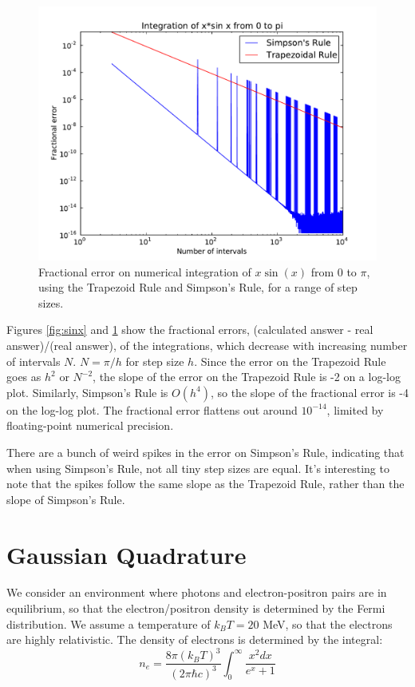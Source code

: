 \documentclass{article}
\begin{document}
\begin{figure}[h]
  \begin{center}
     \includegraphics[width=\textwidth]{xsinx}
  \end{center}
  \caption{Fractional error on numerical integration of $x\sin(x)$ from 0 to $\pi$, using
	   the Trapezoid Rule and Simpson's Rule, for a range of step sizes.}
  \label{fig:xsinx}
\end{figure}

Figures \ref{fig:sinx} and \ref{fig:xsinx} show the fractional errors, (calculated answer - real answer)/(real answer),
of the integrations, which
decrease with increasing number of intervals $N$. $N = \pi/h$ for step size $h$.
Since the error on the Trapezoid Rule goes as $h^2$ or $N^{-2}$, the slope of
the error on the Trapezoid Rule is -2 on a log-log plot.  Similarly, Simpson's
Rule is $O(h^4)$, so the slope of the fractional error is -4 on the log-log plot.
The fractional error flattens out around $10^{-14}$, limited by floating-point
numerical precision.

There are a bunch of weird spikes in the error on Simpson's Rule, indicating that when
using Simpson's Rule, not all tiny step sizes are equal.  It's interesting to note that
the spikes follow the same slope as the Trapezoid Rule, rather than the slope of Simpson's Rule.

\section{Gaussian Quadrature}

We consider an environment where photons and electron-positron pairs are in equilibrium, so that the
electron/positron density is determined by the Fermi distribution.  
We assume a temperature of $k_BT = 20$ MeV, so that the electrons are highly relativistic.  The density
of electrons is determined by the integral:
\begin{equation}
	n_e = \frac{8\pi(k_BT)^3}{(2\pi\hbar c)^3} \int_0^\infty {\frac{x^2 dx}{e^x + 1}}
\end{equation}
\end{document}
